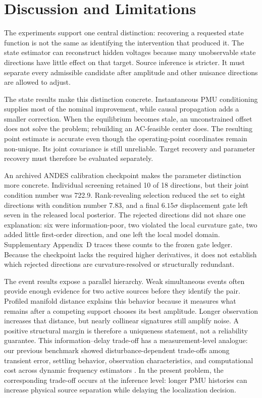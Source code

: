 \section{Discussion and Limitations}
\label{sec:discussion}

The experiments support one central distinction: recovering a requested state function is not the same as identifying the intervention that produced it. The state estimator can reconstruct hidden voltages because many unobservable state directions have little effect on that target. Source inference is stricter. It must separate every admissible candidate after amplitude and other nuisance directions are allowed to adjust.

The state results make this distinction concrete. Instantaneous PMU conditioning supplies most of the nominal improvement, while causal propagation adds a smaller correction. When the equilibrium becomes stale, an unconstrained offset does not solve the problem; rebuilding an AC-feasible center does. The resulting point estimate is accurate even though the operating-point coordinates remain non-unique. Its joint covariance is still unreliable. Target recovery and parameter recovery must therefore be evaluated separately.

An archived ANDES calibration checkpoint makes the parameter distinction more
concrete. Individual screening retained 10 of 18 directions, but their joint
condition number was 722.9. Rank-revealing selection reduced the set to eight
directions with condition number 7.83, and a final $6.15\sigma$ displacement
gate left seven in the released local posterior. The rejected directions did
not share one explanation: six were information-poor, two violated the local
curvature gate, two added little first-order direction, and one left the local
model domain. Supplementary Appendix~D traces these counts to the frozen gate
ledger. Because the checkpoint lacks the required higher derivatives, it does
not establish which rejected directions are curvature-resolved or structurally
redundant.

The event results expose a parallel hierarchy. Weak simultaneous events often provide enough evidence for two active sources before they identify the pair. Profiled manifold distance explains this behavior because it measures what remains after a competing support chooses its best amplitude. Longer observation increases that distance, but nearly collinear signatures still amplify noise. A positive structural margin is therefore a uniqueness statement, not a reliability guarantee. This information--delay trade-off has a measurement-level analogue: our previous benchmark showed disturbance-dependent trade-offs among transient error, settling behavior, observation characteristics, and computational cost across dynamic frequency estimators \cite{Mayorga2026FrequencyBenchmark}. In the present problem, the corresponding trade-off occurs at the inference level: longer PMU histories can increase physical source separation while delaying the localization decision.

